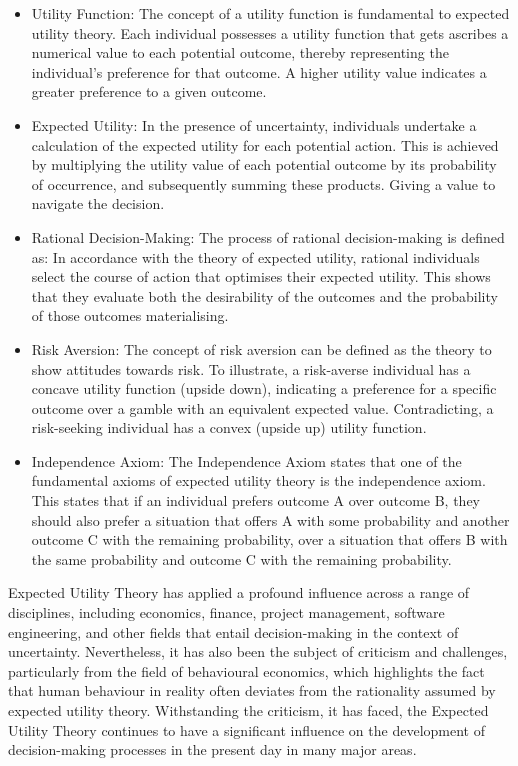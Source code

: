 \begin{itemize}
    \item Utility Function: The concept of a utility function is fundamental to expected utility theory. Each individual possesses a utility function that gets ascribes a numerical value to each potential outcome, thereby representing the individual's preference for that outcome. A higher utility value indicates a greater preference to a given outcome.

\item Expected Utility: In the presence of uncertainty, individuals undertake a calculation of the expected utility for each potential action. This is achieved by multiplying the utility value of each potential outcome by its probability of occurrence, and subsequently summing these products. Giving a value to navigate the decision.


\item Rational Decision-Making: The process of rational decision-making is defined as: In accordance with the theory of expected utility, rational individuals select the course of action that optimises their expected utility. This shows that they evaluate both the desirability of the outcomes and the probability of those outcomes materialising.

\item Risk Aversion: The concept of risk aversion can be defined as  the theory to show attitudes towards risk. To illustrate, a risk-averse individual has a concave utility function (upside down), indicating a preference for a specific outcome over a gamble with an equivalent expected value. Contradicting, a risk-seeking individual has a convex (upside up) utility function.

\item Independence Axiom:  The Independence Axiom states that one of the fundamental axioms of expected utility theory is the independence axiom. This states that if an individual prefers outcome A over outcome B, they should also prefer a situation that offers A with some probability and another outcome C with the remaining probability, over a situation that offers B with the same probability and outcome C with the remaining probability.

\end{itemize}

\noindent Expected Utility Theory has applied a profound influence across a range of disciplines, including economics, finance, project management, software engineering, and other fields that entail decision-making in the context of uncertainty. Nevertheless, it has also been the subject of criticism and challenges, particularly from the field of behavioural economics, which highlights the fact that human behaviour in reality often deviates from the rationality assumed by expected utility theory.
Withstanding the criticism, it has faced, the Expected Utility Theory continues to have a significant influence on the development of decision-making processes in the present day in many major areas. \cite{moscati_expected_2018}


